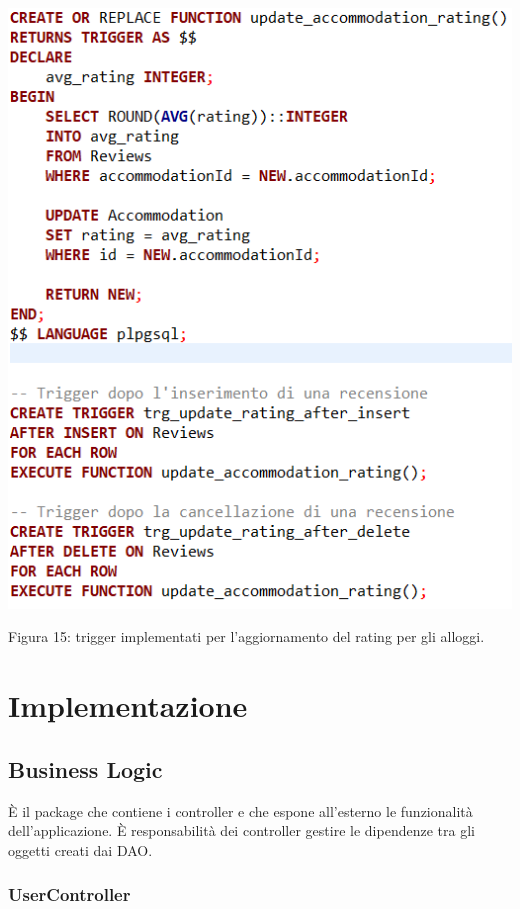 \documentclass[10pt]{article}
\begin{document}
\begin{center}
\par\medskip
\includegraphics[scale=0.65]{trigger/trigger}
\par\medskip
Figura 15: trigger implementati per l'aggiornamento del rating per gli alloggi.
\par\medskip
\end{center}

\section{Implementazione}
\subsection{Business Logic}

\`E il package che contiene i controller e che espone all'esterno le funzionalità dell'applicazione. \`E responsabilità dei controller gestire le dipendenze tra gli oggetti creati dai DAO.

\subsubsection{UserController}
\end{document}
